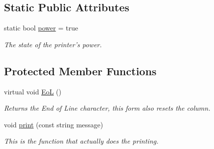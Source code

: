 \subsection*{Static Public Attributes}
\begin{DoxyCompactItemize}
\item 
static bool \hyperlink{classJKBuilder_1_1IOManager_aababa9aef0d20ddcfce2d78f41ae1dd8}{power} = true
\begin{DoxyCompactList}\small\item\em The state of the printer's power. \item\end{DoxyCompactList}\end{DoxyCompactItemize}
\subsection*{Protected Member Functions}
\begin{DoxyCompactItemize}
\item 
virtual void \hyperlink{classJKBuilder_1_1printer_a7f207ac705d33a0cd9794a9f0b4a1fa0}{EoL} ()
\begin{DoxyCompactList}\small\item\em Returns the End of Line character, this form also resets the column. \item\end{DoxyCompactList}\item 
void \hyperlink{classJKBuilder_1_1printer_aa32ee0a81ade611982bfc9861c5a05bb}{print} (const string message)
\begin{DoxyCompactList}\small\item\em This is the function that actually does the printing. \item\end{DoxyCompactList}\end{DoxyCompactItemize}
